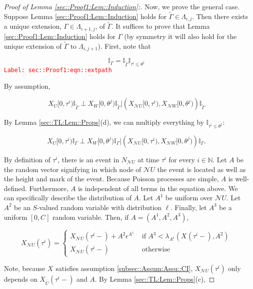 \documentclass[12pt]{article}
\newcommand{\mb}{\mathbb}
\newcommand{\mc}{\mathcal}
\newcommand{\ov}{\overline}
\newcommand{\te}{\text}
\newcommand{\ep}{\epsilon}
\newcommand{\tr}{\textcolor{red}}
\newcommand{\labe}[1]{\tr{\texttt{Label: #1}}}
\newcommand{\ind}{\hspace{24pt}}
\newcommand{\neigh}{\mc{N}}					%
\renewcommand{\U}{U}							%
\newcommand{\UU}{W}								%
\renewcommand{\S}{S}							%
\newcommand{\ev}[1]{\ep^{#1}}					%
\newcommand{\cl}{\ov}							%
\newcommand{\poiss}[1]{N_{#1}}						%
\newcommand{\rt}[1]{\tau^{#1}}						%
\newcommand{\rtt}[1]{\theta^{#1}}					%
\newcommand{\itt}{i}								%
\newcommand{\ittt}{j}								%
\newcommand{\rxvt}[2]{X_{#1}{(#2)}}					%
\newcommand{\rxvts}[2]{X_{#1}{#2}}					%
\newcommand{\rate}[1]{\lambda_{#1}}					%
\newcommand{\const}[1]{C_{#1}}						%
\newcommand{\Sm}{\ell}								%
\newcommand{\alt}{\widetilde}						%
\newcommand{\apath}{\Gamma}						%
\newcommand{\pathset}[2]{\Lambda_{#1,#2}}			%
\newcommand{\rv}{A}								%
\begin{document}
\begin{proof}[Proof of Lemma \ref{sec::Proof1:Lem::Induction}:]
\ind Now, we prove the general case. Suppose Lemma \ref{sec::Proof1:Lem::Induction} holds for \(\alt{\apath} \in \pathset{\itt}{\ittt}\). Then there exists a unique extension, \(\apath \in \pathset{\itt+1}{\ittt}\), of \(\alt{\apath}\). It suffices to prove that Lemma \ref{sec::Proof1:Lem::Induction} holds for \(\apath\) (by symmetry it will also hold for the unique extension of \(\alt{\apath} \te{ to } \pathset{\itt}{\ittt+1}\)). First, note that

\begin{equation}
\mb{I}_{\apath} = \mb{I}_{\alt{\apath}}\mb{I}_{\rt{\itt} \leq \rtt{\ittt}}
\label{sec::Proof1:eqn::extpath}
\end{equation}
\labe{sec::Proof1:eqn::extpath}

By assumption,

\[\rxvts{\U}{[0,\rt{\itt})}\mb{I}_{\alt{\apath}}\perp \rxvts{\UU}{[0,\rtt{\ittt})}\mb{I}_{\alt{\apath}}|\left(\rxvts{\neigh{\U}}{[0,\rt{\itt})},\rxvts{\neigh{\UU}}{[0,\rtt{\ittt})}\right)\mb{I}_{\alt{\apath}}\]

By Lemma \ref{sec::TL:Lem::Props}(d), we can multiply everything by \(\mb{I}_{\rt{\itt} \leq \rtt{\ittt}}\):

\[\rxvts{\U}{[0,\rt{\itt})}\mb{I}_{\apath}\perp \rxvts{\UU}{[0,\rtt{\ittt})}\mb{I}_{\apath}|\left(\rxvts{\neigh{\U}}{[0,\rt{\itt})},\rxvts{\neigh{\UU}}{[0,\rtt{\ittt})}\right)\mb{I}_{\apath}.\]

By definition of \(\rt{\itt}\), there is an event in \(\poiss{\neigh{\U}}\) at time \(\rt{\itt}\) for every \(\itt \in \mb{ N}\). Let \(\rv\) be the random vector signifying in which node of \(\neigh{\U}\) the event is located as well as the height and mark of the event. Because Poisson processes are simple, \(\rv\) is well-defined. Furthermore, \(\rv\) is independent of all terms in the equation above. We can specifically describe the distribution of \(\rv\). Let \(\rv^1\) be uniform over \(\neigh{\U}\). Let \(\rv^2\) be an \(\S\)-valued random variable with distribution \(\Sm\). Finally, let \(\rv^3\) be a uniform \([0,\const{}]\) random variable. Then, if \(\rv=(\rv^1,\rv^2,\rv^3)\),

\[\rxvt{\neigh{\U}}{\rt{\itt}} = \begin{cases}
\rxvt{\neigh{\U}}{\rt{\itt}-} + \rv^2\ev{\rv^1} &\te{ if } \rv^3< \rate{\rv^1}(\rxvt{}{\rt{\itt}-}, \rv^2)\\
\rxvt{\neigh{\U}}{\rt{\itt}-} &\te{ otherwise}
\end{cases}\]

Note, because \(\rxvts{}{}\) satisfies assumption \ref{subsec::Assum:Assu::CI}, \(\rxvt{\neigh{\U}}{\rt{\itt}}\) only depends on \(\rxvt{\cl{\cl{\U}}}{\rt{\itt}-}\) and \(\rv\). By Lemma \ref{sec::TL:Lem::Props}(c), 


\end{proof}
\end{document}
